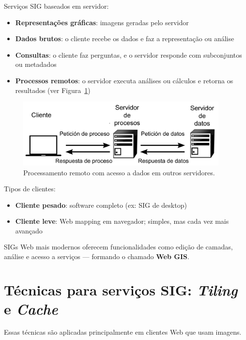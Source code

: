 Serviços SIG baseados em servidor:

\begin{itemize}
 \item \textbf{Representações gráficas}: imagens geradas pelo servidor
 \item \textbf{Dados brutos}: o cliente recebe os dados e faz a representação ou análise
 \item \textbf{Consultas}: o cliente faz perguntas, e o servidor responde com subconjuntos ou metadados
 \item \textbf{Processos remotos}: o servidor executa análises ou cálculos e retorna os resultados (ver Figura~\ref{Fig:Datos_y_procesos_remotos})
\end{itemize}

\begin{figure}[!hbt]   
\centering
\includegraphics[width=0.95\textwidth]{Software/Datos_y_procesos_remotos.png}
\caption{\small Processamento remoto com acesso a dados em outros servidores.}
\label{Fig:Datos_y_procesos_remotos} 
\end{figure}

Tipos de clientes:

\begin{itemize}
 \item \textbf{Cliente pesado}: software completo (ex: SIG de desktop)
 \item \textbf{Cliente leve}: Web mapping em navegador; simples, mas cada vez mais avançado
\end{itemize}

SIGs Web mais modernos oferecem funcionalidades como edição de camadas, análise e acesso a serviços — formando o chamado \textbf{Web GIS}.

\section{Técnicas para serviços SIG: \emph{Tiling} e \emph{Cache}}


Essas técnicas são aplicadas principalmente em clientes Web que usam imagens.

